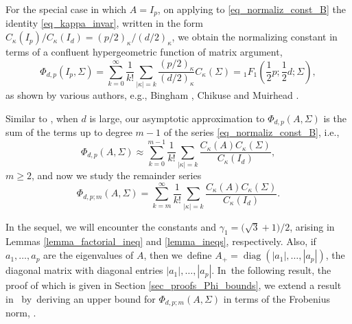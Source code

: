 \documentclass[pdftex]{sigma}
\numberwithin{equation}{section}
\def\tr {\mathop{\mathrm{tr}}}
\def\diag{\mathop{\mathrm{diag}}}
\begin{document}
For the special case in which $A = I_p$, on applying to \eqref{eq_normaliz_const_B} the identity \eqref{eq_kappa_invar}, written in the form $C_\kappa(I_p)/C_\kappa(I_d) = (p/2)_\kappa/(d/2)_\kappa$, we obtain the normalizing constant in terms of a confluent hypergeometric function of matrix argument,
\[
\Phi_{d,p}(I_p,\Sigma) = \sum_{k=0}^\infty \frac{1}{k!} \sum_{|\kappa|=k} \frac{(p/2)_\kappa}{(d/2)_\kappa} C_\kappa(\Sigma) = {}_1F_1\left(\frac12 p;\frac12 d;\Sigma\right),
\]
as shown by various authors, e.g., Bingham \cite{Bingham}, Chikuse \cite[p.~33]{Chikuse} and Muirhead \cite[p.~288]{Muirhead}.

Similar to \cite[equation~(2.4)]{BagyanRichards}, when $d$ is large, our asymptotic approximation to $\Phi_{d,p}(A,\Sigma)$ is the sum of the terms up to degree $m-1$ of the series \eqref{eq_normaliz_const_B}, i.e.,
\begin{equation}
\label{eq_trunc_expan}
\Phi_{d,p}(A,\Sigma) \approx \sum_{k=0}^{m-1} \frac{1}{k!} \sum_{|\kappa|=k} \frac{C_\kappa(A) C_\kappa(\Sigma)}{C_\kappa(I_d)},
\end{equation}
$m \ge 2$, and now we study the remainder series
\begin{equation}
\label{eq_remainder_term}
\Phi_{d,p;m}(A,\Sigma) = \sum_{k=m}^\infty \frac{1}{k!} \sum_{|\kappa|=k} \frac{C_\kappa(A) C_\kappa(\Sigma)}{C_\kappa(I_d)}.
\end{equation}

In the sequel, we will encounter the constants  and $\gamma_1 = \bigl(\sqrt{3}+1\bigr)/2$, arising in Lemmas \ref{lemma_factorial_ineq} and \ref{lemma_ineqs}, respectively. Also, if $a_1,\ldots,a_p$ are the eigenvalues of $A$, then we~define $A_+ = \diag(|a_1|,\ldots,|a_p|)$, the diagonal matrix with diagonal entries $|a_1|,\ldots,|a_p|$. In~the following result, the proof of which is given in Section \ref{sec_proofs_Phi_bounds}, we extend a result in~\cite{BagyanRichards} by~deriving an upper bound for $\Phi_{d,p;m}(A,\Sigma)$ in terms of the Frobenius norm, \smash{$\|\Sigma\| = \bigl[\tr\bigl(\Sigma^2\bigr)\bigr]^{1/2}$}.
\end{document}
